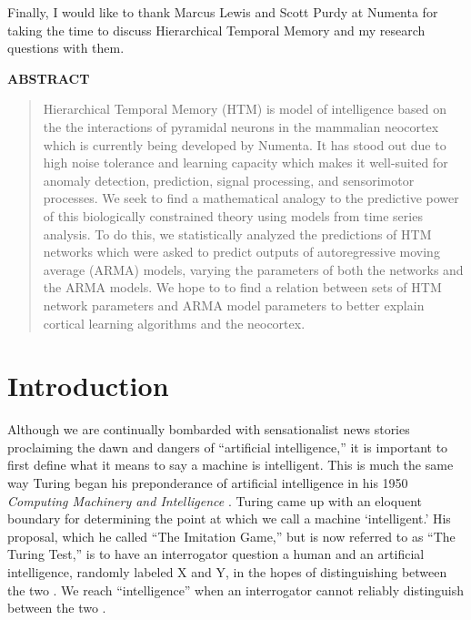 \documentclass[oneside,12pt,openany]{book}
\begin{document}
	Finally, I would like to thank Marcus Lewis and Scott Purdy at Numenta for taking the time to discuss Hierarchical Temporal Memory and my research questions with them.
	\vfill
	\pagebreak
	
	\begin{center}
		\textbf{ABSTRACT}
		
		\begin{quotation}
			\noindent Hierarchical Temporal Memory (HTM) is model of intelligence based on the the interactions of pyramidal neurons in the mammalian neocortex which is currently being developed by Numenta. It has stood out due to high noise tolerance and learning capacity which makes it well-suited for anomaly detection, prediction, signal processing, and sensorimotor processes. We seek to find a mathematical analogy to the predictive power of this biologically constrained theory using models from time series analysis. To do this, we statistically analyzed the predictions of HTM networks which were asked to predict outputs of autoregressive moving average (ARMA) models, varying the parameters of both the networks and the ARMA models. We hope to to find a relation between sets of HTM network parameters and ARMA model parameters to better explain cortical learning algorithms and the neocortex.
		\end{quotation}
		
	\end{center}
	\vfill
	\pagebreak
	\setcounter{tocdepth}{1}
	\listoffigures
	\vfill
	\pagebreak
	
	\listoftables
	\vfill

	\pagebreak
	
	\mainmatter
	\chapter{Introduction}
	
	Although we are continually bombarded with sensationalist news stories proclaiming the dawn and dangers of ``artificial intelligence,'' it is important to first define what it means to say a machine is intelligent. This is much the same way Turing began his preponderance of artificial intelligence in his 1950 \textit{Computing Machinery and Intelligence} \cite{Turing}. Turing came up with an eloquent boundary for determining the point at which we call a machine `intelligent.' His proposal, which he called ``The Imitation Game,'' but is now referred to as ``The Turing Test,'' is to have an interrogator question a human and an artificial intelligence, randomly labeled X and Y, in the hopes of distinguishing between the two \cite{Turing}. We reach ``intelligence'' when an interrogator cannot reliably distinguish between the two \cite{Turing}.
	
\end{document}

